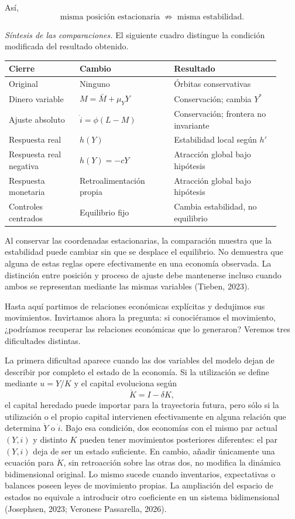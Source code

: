 \documentclass[10.5pt,twoside]{article}
\newcounter{rsec}
\newcommand{\rsection}{%
  \refstepcounter{rsec}%
  \par\vspace{1.35em}%
  \begin{center}\fontsize{14}{16}\selectfont\Roman{rsec}\end{center}%
  \vspace{0.35em}%
}
\begin{document}
Así,
\[
 \mathord{\text{misma posición estacionaria}\;\not\Rightarrow\;
 \text{misma estabilidad}.}
\]
\par\medskip
\noindent\textit{Síntesis de las comparaciones.} El siguiente cuadro distingue la condición modificada del resultado obtenido.\par\smallskip
{\fontsize{8.2}{10.3}\selectfont\setlength{\tabcolsep}{3pt}\renewcommand{\arraystretch}{1.25}
\noindent\begin{tabular}{@{}p{0.24\linewidth}p{0.32\linewidth}p{0.36\linewidth}@{}}
\hline
\textbf{Cierre} & \textbf{Cambio} & \textbf{Resultado}\\ \hline
Original & Ninguno & Órbitas conservativas\\
Dinero variable & $M=\bar M+\mu_Y Y$ & Conservación; cambia $Y^*$\\
Ajuste absoluto & $\dot i=\phi(L-M)$ & Conservación; frontera no invariante\\
Respuesta real & $h(Y)$ & Estabilidad local según $h'$\\
Respuesta real negativa & $h(Y)=-cY$ & Atracción global bajo hipótesis\\
Respuesta monetaria & Retroalimentación propia & Atracción global bajo hipótesis\\
Controles centrados & Equilibrio fijo & Cambia estabilidad, no equilibrio\\ \hline
\end{tabular}}
\par\medskip
Al conservar las coordenadas estacionarias, la comparación muestra que la estabilidad puede cambiar sin que se desplace el equilibrio. No demuestra que alguna de estas reglas opere efectivamente en una economía observada. La distinción entre posición y proceso de ajuste debe mantenerse incluso cuando ambos se representan mediante las mismas variables (Tieben, 2023).

\rsection
Hasta aquí partimos de relaciones económicas explícitas y dedujimos sus movimientos. Invirtamos ahora la pregunta: si conociéramos el movimiento, ¿podríamos recuperar las relaciones económicas que lo generaron? Veremos tres dificultades distintas.

La primera dificultad aparece cuando las dos variables del modelo dejan de describir por completo el estado de la economía. Si la utilización se define mediante $u=Y/K$ y el capital evoluciona según
\[
 \dot K=I-\delta K,
\]
el capital heredado puede importar para la trayectoria futura, pero sólo si la utilización o el propio capital intervienen efectivamente en alguna relación que determina $\dot Y$ o $\dot i$. Bajo esa condición, dos economías con el mismo par actual $(Y,i)$ y distinto $K$ pueden tener movimientos posteriores diferentes: el par $(Y,i)$ deja de ser un estado suficiente. En cambio, añadir únicamente una ecuación para $\dot K$, sin retroacción sobre las otras dos, no modifica la dinámica bidimensional original. Lo mismo sucede cuando inventarios, expectativas o balances poseen leyes de movimiento propias. La ampliación del espacio de estados no equivale a introducir otro coeficiente en un sistema bidimensional (Josephsen, 2023; Veronese Passarella, 2026).
\end{document}
